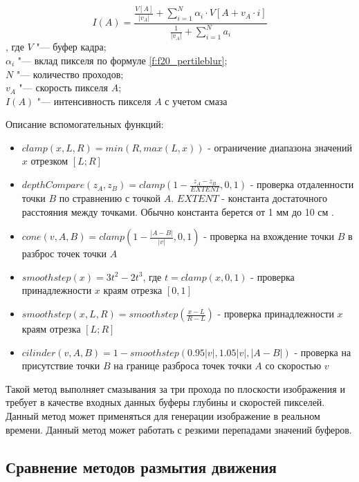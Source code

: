 \begin{eqndesc}
    \begin{equation} \label{f:f20_pertileblur_I}
        I(A) = \frac{\frac{V[A]}{|v_A|} +
        \sum_{i=1}^N
        {\alpha_i \cdot V[A + v_A \cdot i]}
        }{\frac{1}{|v_A|} + \sum_{i=1}^N  a_i}
    \end{equation}
    , где  $V$ "--- буфер кадра;\\
    $\alpha_i$ "--- вклад пикселя по формуле \eqref{f:f20_pertileblur};\\
    $N$ "--- количество проходов;\\
    $v_A$ "--- скорость пикселя $A$; \\
    $I(A)$ "--- интенсивность пикселя $A$ с учетом смаза
\end{eqndesc}

Описание вспомогательных функций:
\begin{itemize}
    \item $clamp(x, L, R) = min(R, max(L, x))$ - ограничение диапазона значений $x$ отрезком $[L;R]$
    \item $depthCompare(z_A, z_B) = clamp(1 - \frac{z_A - z_B}{EXTENT}, 0, 1)$ - проверка отдаленности точки $B$ по стравнению с точкой $A$. $EXTENT$ - константа достаточного расстояния между точками. Обычно константа берется от 1 мм до 10 см  \cite{McGuire12}.
    \item $cone(v, A, B) = clamp(1 - \frac{|A-B|}{|v|}, 0,1)$ - проверка на вхождение точки $B$ в разброс точек точки $A$
    \item $smoothstep(x) = 3 t^2 - 2t^3$, где $t = clamp(x, 0, 1)$ -  проверка принадлежности $x$ краям отрезка $[0, 1]$
    \item $smoothstep(x, L, R) = smoothstep(\frac{x - L}{R -
                  L})$ - проверка принадлежности $x$ краям отрезка $[L; R]$
    \item $cilinder(v, A, B) = 1 - smoothstep(0.95 |v|, 1.05|v|, |A - B|)$ - проверка на присутствие точки $B$ на границе разброса точек точки $A$ со скоростью $v$
\end{itemize}

Такой метод выполняет смазывания за три прохода по плоскости изображения и требует в качестве входных данных буферы глубины и скоростей пикселей. Данный метод может применяться для генерации изображение в реальном времени. Данный метод может работать с резкими перепадами значений буферов.

\subsection{Сравнение методов размытия движения}

